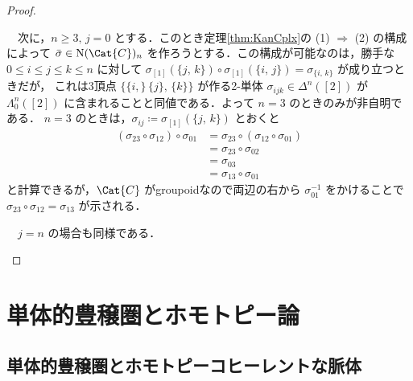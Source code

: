 \documentclass[TQFT_main]{subfiles}
\begin{document}
\begin{proof}
\begin{description}
        　次に，$n \ge 3,\, j=0$ とする．このとき定理\ref{thm:KanCplx}の (1) $\Longrightarrow$ (2) の構成によって $\bar{\sigma} \in \mathrm{N}(\Cat{C})_n$ を作ろうとする．この構成が可能なのは，勝手な $0 \le i \le j \le k \le n$ に対して $\sigma_{[1]} (\{j,\, k\}) \circ \sigma_{[1]} (\{i,\, j\}) = \sigma_{\{i,\, k\}}$ が成り立つときだが，
        これは3頂点 $\bigl\{\{i,\}\, \{j\},\, \{k\}\bigr\}$ が作る2-単体 $\sigma_{ijk} \in \Delta^n([2])$ が $\Lambda^n_0([2])$ に含まれることと同値である．よって $n=3$ のときのみが非自明である．
        $n=3$ のときは，$\sigma_{ij} \coloneqq \sigma_{[1]} (\{j,\, k\})$ とおくと
        \begin{align}
            (\sigma_{23} \circ \sigma_{12}) \circ \sigma_{01}
            &= \sigma_{23} \circ (\sigma_{12} \circ \sigma_{01}) \\
            &= \sigma_{23} \circ \sigma_{02} \\
            &= \sigma_{03} \\
            &= \sigma_{13} \circ \sigma_{01}
        \end{align}
        と計算できるが，$\Cat{C}$ がgroupoidなので両辺の右から $\sigma_{01}^{-1}$ をかけることで $\sigma_{23} \circ \sigma_{12} = \sigma_{13}$ が示される．

        　$j=n$ の場合も同様である．
    \end{description}
    
\end{proof}

\section{単体的豊穣圏とホモトピー論}

\subsection{単体的豊穣圏とホモトピーコヒーレントな脈体}
\end{document}
